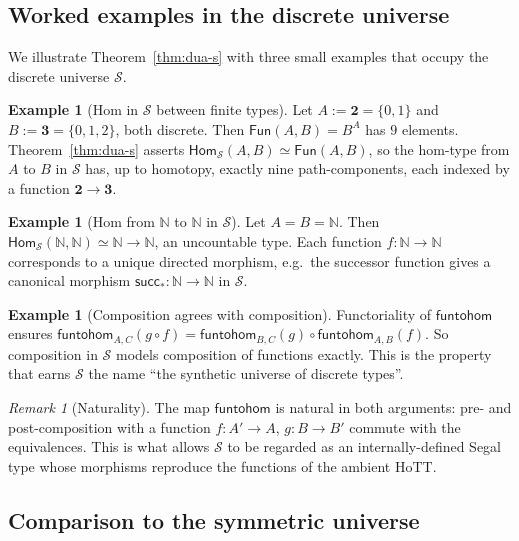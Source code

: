 \documentclass[12pt]{article}
\theoremstyle{definition}
\newtheorem{example}[theorem]{Example}
\theoremstyle{remark}
\newtheorem{remark}[theorem]{Remark}
\newcommand{\N}{\mathbb{N}}
\newcommand{\Hom}{\mathsf{Hom}}
\newcommand{\Fun}{\mathsf{Fun}}
\newcommand{\funtohom}{\mathsf{funtohom}}
\newcommand{\eqv}{\simeq}
\begin{document}
\subsection{Worked examples in the discrete universe}

We illustrate Theorem~\ref{thm:dua-s} with three small examples that occupy the discrete universe $\mathcal{S}$.

\begin{example}[Hom in $\mathcal{S}$ between finite types]\label{ex:fin-hom}
Let $A := \mathbf{2} = \{0,1\}$ and $B := \mathbf{3} = \{0,1,2\}$, both discrete. Then $\Fun(A, B) = B^A$ has $9$ elements. Theorem~\ref{thm:dua-s} asserts $\Hom_{\mathcal{S}}(A,B) \eqv \Fun(A,B)$, so the hom-type from $A$ to $B$ in $\mathcal{S}$ has, up to homotopy, exactly nine path-components, each indexed by a function $\mathbf{2} \to \mathbf{3}$.
\end{example}

\begin{example}[Hom from $\N$ to $\N$ in $\mathcal{S}$]\label{ex:nn-hom}
Let $A = B = \N$. Then $\Hom_{\mathcal{S}}(\N, \N) \eqv \N \to \N$, an uncountable type. Each function $f : \N \to \N$ corresponds to a unique directed morphism, e.g.\ the successor function gives a canonical morphism $\mathsf{succ}_* : \N \to \N$ in $\mathcal{S}$.
\end{example}

\begin{example}[Composition agrees with composition]\label{ex:composition}
Functoriality of $\funtohom$ ensures $\funtohom_{A,C}(g \circ f) = \funtohom_{B,C}(g) \circ \funtohom_{A,B}(f)$. So composition in $\mathcal{S}$ models composition of functions exactly. This is the property that earns $\mathcal{S}$ the name ``the synthetic universe of discrete types''.
\end{example}

\begin{remark}[Naturality]\label{rem:naturality}
The map $\funtohom$ is natural in both arguments: pre- and post-composition with a function $f : A' \to A$, $g : B \to B'$ commute with the equivalences. This is what allows $\mathcal{S}$ to be regarded as an internally-defined Segal type whose morphisms reproduce the functions of the ambient HoTT.
\end{remark}

\subsection{Comparison to the symmetric universe}
\end{document}
